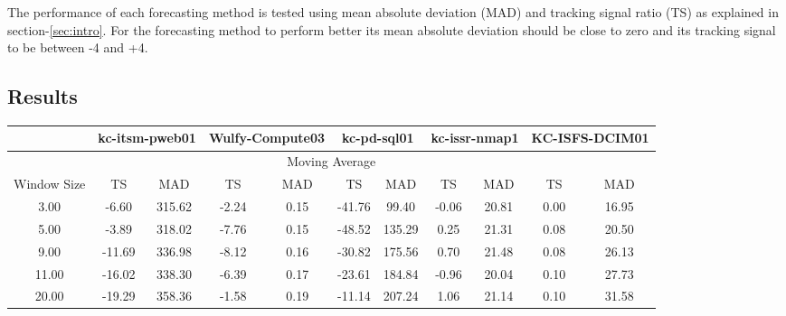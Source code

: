 \documentclass[conference,onecolumn]{IEEEtran}
\begin{document}
The performance of each forecasting method is tested using mean absolute deviation (MAD) and tracking signal ratio (TS) as explained in section-\ref{sec:intro}. For the forecasting method to perform better its mean absolute deviation should be close to zero and its tracking signal to be between -4 and +4.

\subsection{Results}
\label{subsec:results}

\begin{table}[ht]
\centering
\begin{tabular}{|c|c|c|c|c|c|c|c|c|c|c|}
\hline
            & \multicolumn{2}{c|}{kc-itsm-pweb01} & \multicolumn{2}{c|}{Wulfy-Compute03} & \multicolumn{2}{c|}{kc-pd-sql01} & \multicolumn{2}{c|}{kc-issr-nmap1} & \multicolumn{2}{c|}{KC-ISFS-DCIM01} \\ \hline
\multicolumn{11}{|c|}{Moving Average}                                                                                                                                                                  \\ \hline
Window Size & TS               & MAD              & TS                 & MAD             & TS              & MAD            & TS               & MAD             & TS               & MAD              \\ \hline
3.00        & -6.60            & 315.62           & -2.24              & 0.15            & -41.76          & 99.40          & -0.06            & 20.81           & 0.00             & 16.95            \\ \hline
5.00        & -3.89            & 318.02           & -7.76              & 0.15            & -48.52          & 135.29         & 0.25             & 21.31           & 0.08             & 20.50            \\ \hline
9.00        & -11.69           & 336.98           & -8.12              & 0.16            & -30.82          & 175.56         & 0.70             & 21.48           & 0.08             & 26.13            \\ \hline
11.00       & -16.02           & 338.30           & -6.39              & 0.17            & -23.61          & 184.84         & -0.96            & 20.04           & 0.10             & 27.73            \\ \hline
20.00       & -19.29           & 358.36           & -1.58              & 0.19            & -11.14          & 207.24         & 1.06             & 21.14           & 0.10             & 31.58            \\ \hline

\end{tabular}
\end{table}
\end{document}
